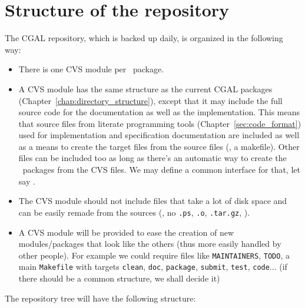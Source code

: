 \section{Structure of the repository}
\label{sec:cvs_structure}

The CGAL repository, which is backed up daily,
is organized in the following way:
\begin{itemize}
\item There is one CVS module per \cgal\ package.
\item A CVS module has the same structure as the current CGAL packages
      (Chapter~\ref{chap:directory_structure}),
      except that it may include the full source code for the documentation
      as well as the implementation.  This means that source files from
      literate programming tools (Chapter~\ref{sec:code_format}) used for 
      implementation and specification documentation are included as well
      as a means to create the target files from the source files (\eg,
      a makefile). Other files can be included too as long as there's an 
      automatic way to create the \cgal\ packages from the CVS files. We 
      may define a common interface for that, let say .
\item The CVS module should not include files that take a lot of disk space and 
      can be easily remade from the sources (\ie, no \texttt{.ps}, \texttt{.o},
      \texttt{.tar.gz}, \etc).
\item A  CVS module will be provided to ease the creation
      of new modules/packages that look like the others (thus more easily
      handled by other people).  For example we could require files like
      \texttt{MAINTAINERS}, \texttt{TODO}, a main \texttt{Makefile}
      with targets \texttt{clean}, \texttt{doc}, \texttt{package},
      \texttt{submit}, \texttt{test}, \texttt{code}...  (if there
      should be a common structure, we shall decide it)
\end{itemize}

The repository tree will have the following structure:
	
